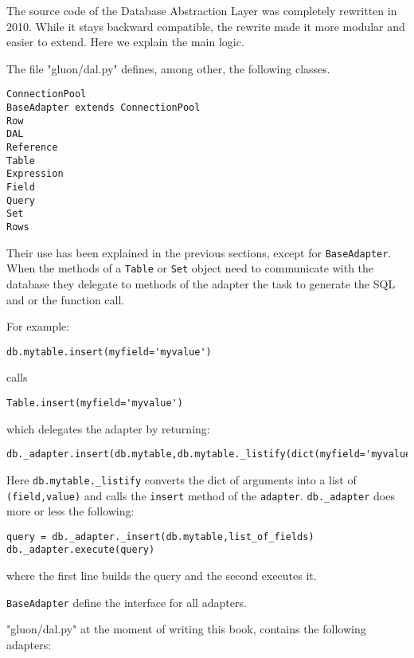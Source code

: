 \documentclass[justified,sixbynine,notoc]{tufte-book}
\def\ft{\small\tt}
\begin{document}
\begin{fullwidth}
The source code of the Database Abstraction Layer was completely rewritten in 2010. While it stays backward compatible, the rewrite made it more modular and easier to extend. Here we explain the main logic.

The file "gluon/dal.py" defines, among other, the following classes.

\begin{lstlisting}
ConnectionPool
BaseAdapter extends ConnectionPool
Row
DAL
Reference
Table
Expression
Field
Query
Set
Rows
\end{lstlisting}

Their use has been explained in the previous sections, except for {\ft BaseAdapter}. When the methods of a {\ft Table} or {\ft Set} object need to communicate with the database they delegate to methods of the adapter the task to generate the SQL and or the function call.

For example:

\begin{lstlisting}
db.mytable.insert(myfield='myvalue')
\end{lstlisting}
\noindent calls

\begin{lstlisting}
Table.insert(myfield='myvalue')
\end{lstlisting}
\noindent which delegates the adapter by returning:

\begin{lstlisting}
db._adapter.insert(db.mytable,db.mytable._listify(dict(myfield='myvalue')))
\end{lstlisting}

Here {\ft db.mytable.\_listify} converts the dict of arguments into a list of {\ft (field,value)} and calls the {\ft insert} method of the {\ft adapter}. {\ft db.\_adapter} does more or less the following:

\begin{lstlisting}
query = db._adapter._insert(db.mytable,list_of_fields)
db._adapter.execute(query)
\end{lstlisting}
\noindent where the first line builds the query and the second executes it.

{\ft BaseAdapter} define the interface for all adapters.

"gluon/dal.py" at the moment of writing this book, contains the following adapters:


\end{fullwidth}
\end{document}
